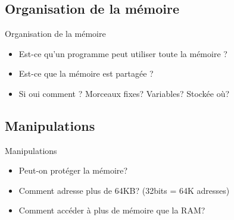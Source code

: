 \section{\sectitle}
\begin{frame}{\sectitle}
\def\subsectitle{Organisation de la mémoire}
\subsection{\subsectitle}
\begin{block}{\subsectitle}
\begin{itemize}
    \item Est-ce qu'un programme peut utiliser toute la mémoire ?
    \item Est-ce que la mémoire est partagée ?
    \item Si oui comment ? Morceaux fixes? Variables? Stockée où?
\end{itemize}
\end{block}

\def\subsectitle{Manipulations}
\subsection{\subsectitle}
\begin{block}{\subsectitle}
\begin{itemize}
    \item Peut-on protéger la mémoire?
    \item Comment adresse plus de 64KB? (32bits = 64K adresses)
    \item Comment accéder à plus de mémoire que la RAM?
\end{itemize}
\end{block}
\end{frame}

\def\sectitle{Type de mémoires}
